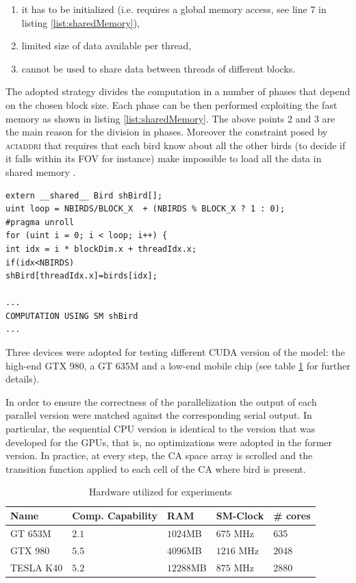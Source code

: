 \begin{enumerate}
	\item it has to be initialized (i.e. requires a global memory access, see line 7 in listing \ref{list:sharedMemory}),
	\item limited size of data available per thread,
	\item cannot be used to share data between threads of different blocks.
\end{enumerate}
The adopted strategy divides the computation in a number of phases that depend on the chosen block size. Each phase can be then performed exploiting the fast memory as shown in listing \ref{list:sharedMemory}.
The above points 2 and 3 are the main reason for the division in phases.
Moreover the constraint posed by \textsc{aciaddri} that requires that each bird know about all the other birds (to decide if it falls within its FOV for instance) make impossible to load all the data in shared memory \cite{Richmond_ahigh,Nguyen:2007}.
\begin{lstlisting}[label = {list:sharedMemory}, caption=Main loop of the agent function kernel. The loop variable represents the number of phases which one at time use SM to store data of a portion of the whole bird population.]
extern __shared__ Bird shBird[];
uint loop = NBIRDS/BLOCK_X  + (NBIRDS % BLOCK_X ? 1 : 0);
#pragma unroll
for (uint i = 0; i < loop; i++) {
int idx = i * blockDim.x + threadIdx.x;
if(idx<NBIRDS)
shBird[threadIdx.x]=birds[idx];

...
COMPUTATION USING SM shBird
...

\end{lstlisting}

Three  devices were adopted for testing different CUDA version of the
model: the high-end GTX 980, a GT 635M and a low-end mobile chip (see
table \ref{tab:adoptedHW} for further details).

In order to ensure the correctness of the parallelization the output of each parallel version were matched against the corresponding serial output. In particular, the sequential CPU version is identical to the version that was developed for the GPUs, that is, no optimizations were adopted in the former version. In practice, at every step, the CA space array is scrolled and the transition function applied to each cell of the CA where bird is present.

\begin{table}[h!]
	\centering
	\begin{tabular}{|l |l |l| l|l|}
		\hline
		Name & Comp. Capability & RAM &
		SM-Clock & \# cores\\
		\hline
		GT 653M & \(2.1\) & \(1024\)MB  & $675$ MHz  & 635\\
		GTX 980& \(5.5\) & \(4096\)MB  & $1216$ MHz & 2048 \\
		TESLA K40& \(5.2\) & \(12288\)MB  & $875$ MHz & 2880 \\
		\hline
	\end{tabular}
	\caption{Hardware utilized for experiments}
	\label{tab:adoptedHW}
\end{table}

